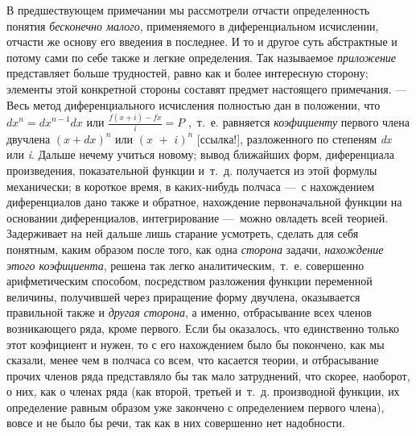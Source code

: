 {В предшествующем примечании мы рассмотрели отчасти определенность понятия
{\em бесконечно малого}, применяемого в диференциальном
исчислении, отчасти же основу его введения в последнее. И то и другое суть
абстрактные и потому сами по себе также и легкие определения. Так
называемое {\em приложение} представляет больше
трудностей, равно как и более интересную сторону; элементы этой конкретной
стороны составят предмет настоящего примечания. — Весь метод
диференциального исчисления полностью дан в положении, что 
$\mathit{dx}^n=\mathit{dx}^{n-1}\mathit{dx}$  или 
$\frac{f\left(x+i\right)-\mathit{fx}} i=P$ ,~т.~е. равняется
{\em коэфициенту} первого члена двучлена 
$(x+\mathit{dx})^n$  или  $(x\text{~}+\text{~}i)^n$
[ссылка!], разложенного по степеням {\em dx} или {\em i}. Дальше нечему
учиться новому; вывод ближайших форм, диференциала произведения,
показательной функции и~т.~д. получается из этой формулы механически; в
короткое время, в каких-нибудь полчаса —~с нахождением диференциалов дано
также и обратное, нахождение первоначальной функции на основании
диференциалов, интегрирование —~можно овладеть всей теорией. Задерживает на
ней дальше лишь старание усмотреть, сделать для себя понятным, каким
образом после того, как одна {\em сторона} задачи,
{\em нахождение этого коэфициента}, решена так легко
аналитическим,~т.~е. совершенно арифметическим способом, посредством
разложения функции переменной величины, получившей через приращение форму
двучлена, оказывается правильной также и {\em другая
сторона}, а именно, отбрасывание всех членов возникающего ряда, кроме
первого. Если бы оказалось, что единственно только этот коэфициент и нужен,
то с его нахождением было бы покончено, как мы сказали, менее чем в полчаса
со всем, что касается теории, и отбрасывание прочих членов ряда
представляло бы так мало затруднений, что скорее, наоборот, о них, как о
членах ряда (как второй, третьей и~т.~д. производной функции, их
определение равным образом уже закончено с определением первого члена),
вовсе и не было бы речи, так как в них совершенно нет надобности.

}

